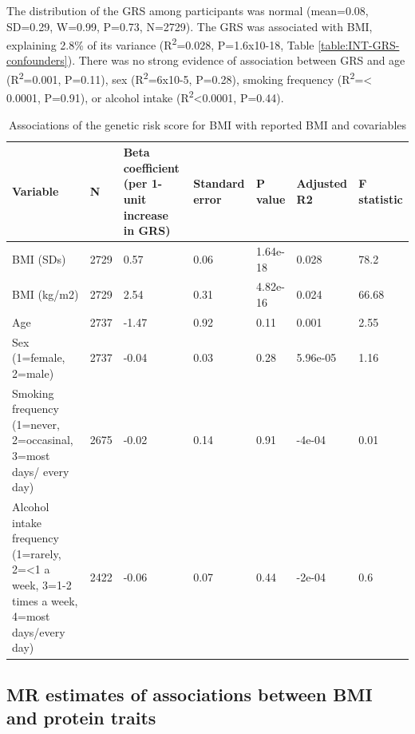 \documentclass[11pt,twoside]{bristolthesis}
\begin{document}
The distribution of the GRS among participants was normal (mean=0.08, SD=0.29, W=0.99, P=0.73, N=2729). The GRS was associated with BMI, explaining 2.8\% of its variance (R\textsuperscript{2}=0.028, P=1.6x10-18, Table \ref{table:INT-GRS-confounders}). There was no strong evidence of association between GRS and age (R\textsuperscript{2}=0.001, P=0.11), sex (R\textsuperscript{2}=6x10-5, P=0.28), smoking frequency (R\textsuperscript{2}=\textless{} 0.0001, P=0.91), or alcohol intake (R\textsuperscript{2}\textless0.0001, P=0.44).
\begin{landscape}\begin{table}

\caption{\label{tab:INT-GRS-confounders}Associations of the genetic risk score for BMI with reported BMI and covariables}
\centering
\begin{tabu} to 
\toprule
Variable & N & Beta coefficient (per 1-unit increase in GRS) & Standard error & P value & Adjusted R2 & F statistic\\
\midrule
BMI (SDs) & 2729 & 0.57 & 0.06 & 1.64e-18 & 0.028 & 78.2\\
BMI (kg/m2) & 2729 & 2.54 & 0.31 & 4.82e-16 & 0.024 & 66.68\\
Age & 2737 & -1.47 & 0.92 & 0.11 & 0.001 & 2.55\\
Sex (1=female, 2=male) & 2737 & -0.04 & 0.03 & 0.28 & 5.96e-05 & 1.16\\
Smoking frequency (1=never, 2=occasinal, 3=most days/ every day) & 2675 & -0.02 & 0.14 & 0.91 & -4e-04 & 0.01\\
\addlinespace
Alcohol intake frequency (1=rarely, 2=<1 a week, 3=1-2 times a week, 4=most days/every day) & 2422 & -0.06 & 0.07 & 0.44 & -2e-04 & 0.6\\
\bottomrule
\end{tabu}
\end{table}
\end{landscape}
\hypertarget{mr-estimates-of-associations-between-bmi-and-protein-traits}{%
\subsection{MR estimates of associations between BMI and protein traits}\label{mr-estimates-of-associations-between-bmi-and-protein-traits}}
\end{document}
